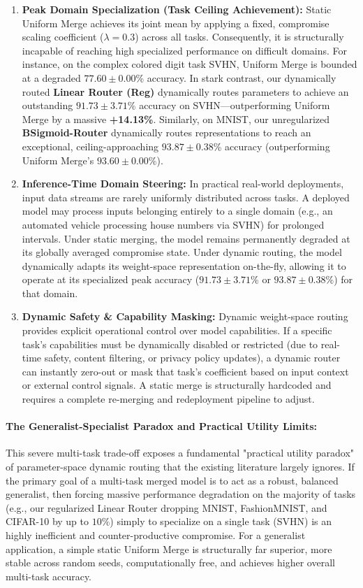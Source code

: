 \begin{enumerate}
    \item \textbf{Peak Domain Specialization (Task Ceiling Achievement):} Static Uniform Merge achieves its joint mean by applying a fixed, compromise scaling coefficient ($\lambda = 0.3$) across all tasks. Consequently, it is structurally incapable of reaching high specialized performance on difficult domains. For instance, on the complex colored digit task SVHN, Uniform Merge is bounded at a degraded $77.60 \pm 0.00$\% accuracy. In stark contrast, our dynamically routed \textbf{Linear Router (Reg)} dynamically routes parameters to achieve an outstanding $91.73 \pm 3.71$\% accuracy on SVHN---outperforming Uniform Merge by a massive \textbf{+14.13\%}. Similarly, on MNIST, our unregularized \textbf{BSigmoid-Router} dynamically routes representations to reach an exceptional, ceiling-approaching $93.87 \pm 0.38$\% accuracy (outperforming Uniform Merge's $93.60 \pm 0.00$\%). 
    \item \textbf{Inference-Time Domain Steering:} In practical real-world deployments, input data streams are rarely uniformly distributed across tasks. A deployed model may process inputs belonging entirely to a single domain (e.g., an automated vehicle processing house numbers via SVHN) for prolonged intervals. Under static merging, the model remains permanently degraded at its globally averaged compromise state. Under dynamic routing, the model dynamically adapts its weight-space representation on-the-fly, allowing it to operate at its specialized peak accuracy ($91.73 \pm 3.71$\% or $93.87 \pm 0.38$\%) for that domain.
    \item \textbf{Dynamic Safety \& Capability Masking:} Dynamic weight-space routing provides explicit operational control over model capabilities. If a specific task's capabilities must be dynamically disabled or restricted (due to real-time safety, content filtering, or privacy policy updates), a dynamic router can instantly zero-out or mask that task's coefficient based on input context or external control signals. A static merge is structurally hardcoded and requires a complete re-merging and redeployment pipeline to adjust.
\end{enumerate}

\paragraph{The Generalist-Specialist Paradox and Practical Utility Limits:}
This severe multi-task trade-off exposes a fundamental "practical utility paradox" of parameter-space dynamic routing that the existing literature largely ignores. If the primary goal of a multi-task merged model is to act as a robust, balanced generalist, then forcing massive performance degradation on the majority of tasks (e.g., our regularized Linear Router dropping MNIST, FashionMNIST, and CIFAR-10 by up to $10\%$) simply to specialize on a single task (SVHN) is an highly inefficient and counter-productive compromise. For a generalist application, a simple static Uniform Merge is structurally far superior, more stable across random seeds, computationally free, and achieves higher overall multi-task accuracy. 

